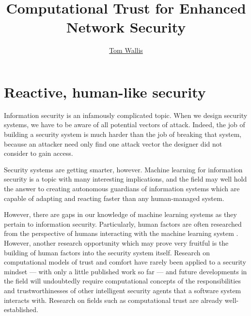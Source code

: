 \documentclass{tufte-handout}
\title{Computational Trust for Enhanced Network Security}
\author[Tom Wallis]{\href{http://tomwallis.net}{Tom Wallis}}
\date{}  %
\begin{document}
\maketitle%

\bigskip



\section{Reactive, human-like security}
Information security is an infamously complicated topic. When we design security systems, we have to be aware of all potential vectors of attack. Indeed, the job of building a security system is much harder than the job of breaking that system, because an attacker need only find one attack vector the designer did not consider to gain access. \par

Security systems are getting smarter, however. Machine learning for information security is a topic with many interesting implications, and the field may well hold the answer to creating autonomous guardians of information systems which are capable of adapting and reacting faster than any human-managed system. \par

However, there are gaps in our knowledge of machine learning systems as they pertain to information security. Particularly, human factors are often researched from the perspective of humans interacting with the machine learning system \cite{Barreno06canmachine}. However, another research opportunity which may prove very fruitful is the building of human factors into the security system itself. Research on computational models of trust and comfort have rarely been applied to a security mindset --- with only a little published work so far \cite{nokiaresearch} --- and future developments in the field will undoubtedly require computational concepts of
the responsibilities and trustworthinesses of other intelligent security agents that a software system interacts with. Research on fields such as computational trust are already well-established. \par
\end{document}
